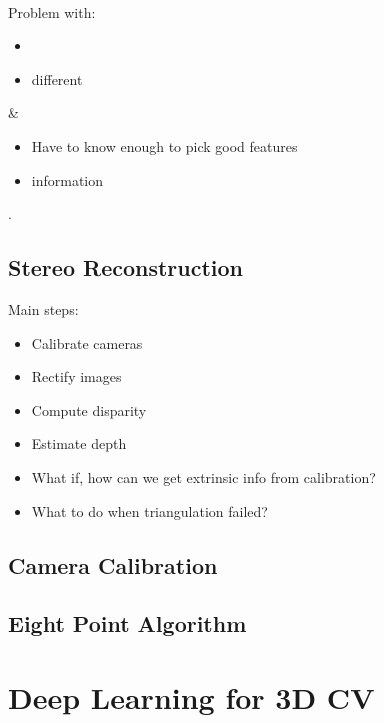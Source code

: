 \begin{table}[hbt!]
\begin{tabularx}
		\\
		Problem with:
		\begin{itemize}
			\item {}
			\item different 
		\end{itemize} &
		\begin{itemize}
			\item Have to know enough to pick good features
			\item {} information
		\end{itemize}
	\end{tabularx}
\end{table}

\note {}.

\subsection{Stereo Reconstruction}
Main steps:
\begin{itemize}
	\item Calibrate cameras
	\item Rectify images
	\item Compute disparity
	\item Estimate depth
\end{itemize}
\begin{itemize}
	\item What if, how can we get extrinsic \ac{info} from calibration?
	\item What to do when triangulation failed?
\end{itemize}

\subsection{Camera Calibration}
\subsection{Eight Point Algorithm}

\section{Deep Learning for 3D CV}

